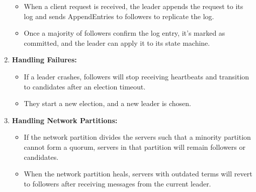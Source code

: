 \begin{enumerate}
\begin{itemize}
            \item When a client request is received, the leader appends the
                request to its log and sends AppendEntries to followers to
                replicate the log.

            \item Once a majority of followers confirm the log entry, it’s
                marked as committed, and the leader can apply it to its state machine.
        \end{itemize}

    \item \textbf{Handling Failures:}
        \begin{itemize}
            \item If a leader crashes, followers will stop receiving heartbeats
                and transition to candidates after an election timeout.

            \item They start a new election, and a new leader is chosen.
        \end{itemize}

    \item \textbf{Handling Network Partitions:}
        \begin{itemize}
            \item If the network partition divides the servers such that a minority
                partition cannot form a quorum, servers in that partition will
                remain followers or candidates.

            \item When the network partition heals, servers with outdated terms
                will revert to followers after receiving messages from the
                current leader.
        \end{itemize}
\end{enumerate}